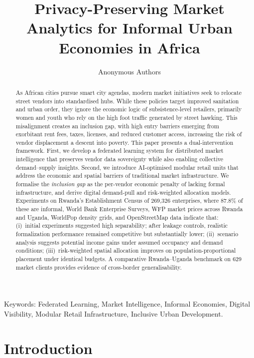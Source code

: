 \documentclass{article}
\title{Privacy-Preserving Market Analytics for Informal Urban Economies in Africa}
\author{
Anonymous Authors
}
\begin{document}
\maketitle

\begin{abstract}
As African cities pursue smart city agendas, modern market initiatives seek to relocate street vendors into standardised hubs. While these policies target improved sanitation and urban order, they ignore the economic logic of subsistence-level retailers, primarily women and youth who rely on the high foot traffic generated by street hawking.
This misalignment creates an inclusion gap, with high entry barriers emerging from exorbitant rent fees, taxes, licenses, and reduced customer access, increasing the risk of vendor displacement a descent into poverty. This paper presents a dual-intervention framework.
First, we develop a federated learning system for distributed market intelligence that preserves vendor data sovereignty while also enabling collective demand--supply insights.
Second, we introduce AI-optimised modular retail units that address the economic and spatial barriers of traditional market infrastructure.
We formalise the \emph{inclusion gap} as the per-vendor economic penalty of lacking formal infrastructure, and derive digital demand-pull and risk-weighted allocation models.
Experiments on Rwanda's Establishment Census of 269,326 enterprises, where 87.8\% of these are informal, World Bank Enterprise Surveys, WFP market prices across Rwanda and Uganda, WorldPop density grids, and OpenStreetMap data indicate that:
(i)~initial experiments suggested high separability; after leakage controls, realistic formalization performance remained competitive but substantially lower;
(ii)~scenario analysis suggests potential income gains under assumed occupancy and demand conditions;
(iii)~risk-weighted spatial allocation improves on population-proportional placement under identical budgets.
A comparative Rwanda--Uganda benchmark on 629 market clients provides evidence of cross-border generalisability.
\end{abstract}

\noindent Keywords: Federated Learning, Market Intelligence, Informal Economies, Digital Visibility, Modular Retail Infrastructure, Inclusive Urban Development.

\section{Introduction}
\label{sec:intro}
\end{document}
